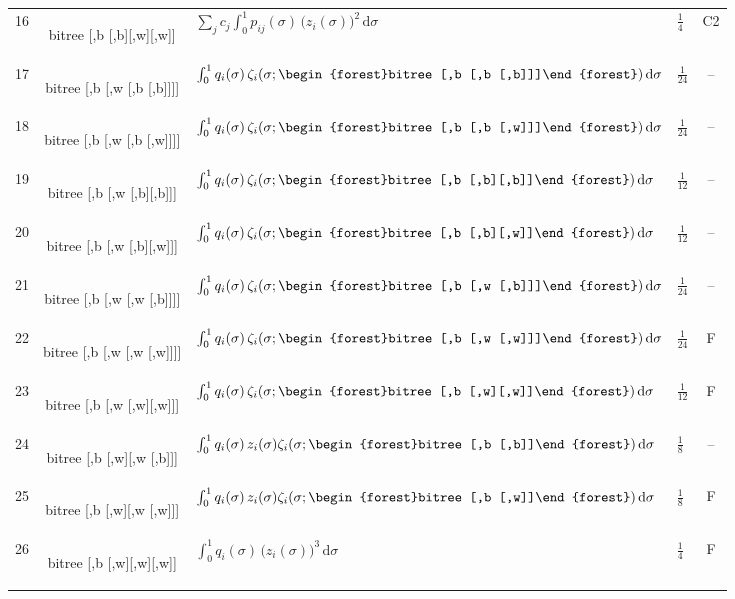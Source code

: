 \documentclass[11pt,a4paper]{article}
\theoremstyle{definition}
\theoremstyle{remark}
\newcommand{\dd}{\,\mathrm{d}}
\newcommand{\btree}[1]{\begin{forest}bitree #1\end{forest}}
\newcommand{\Tbb}{\btree{[,b [,b]]}}
\newcommand{\Tbw}{\btree{[,b [,w]]}}
\newcommand{\Tbbb}{\btree{[,b [,b][,b]]}}
\newcommand{\Tbbw}{\btree{[,b [,b][,w]]}}
\newcommand{\Tbww}{\btree{[,b [,w][,w]]}}
\newcommand{\Tbbbl}{\btree{[,b [,b [,b]]]}}
\newcommand{\Tbbwl}{\btree{[,b [,b [,w]]]}}
\newcommand{\Tbwbl}{\btree{[,b [,w [,b]]]}}
\newcommand{\Tbwwl}{\btree{[,b [,w [,w]]]}}
\begin{document}
{\begin{longtable}{rcllc}
16 & \btree{[,b [,b][,w][,w]]} & $\sum_j c_j\int_0^1 p_{ij}(\sigma)\,\big(z_i(\sigma)\big)^{2}\dd\sigma$ & $\frac1{4}$ & C2\\[3pt]
17 & \btree{[,b [,w [,b [,b]]]]} & $\int_0^1 q_i(\sigma)\,\zeta_i(\sigma;\Tbbbl)\dd\sigma$ & $\frac1{24}$ & --\\[3pt]
18 & \btree{[,b [,w [,b [,w]]]]} & $\int_0^1 q_i(\sigma)\,\zeta_i(\sigma;\Tbbwl)\dd\sigma$ & $\frac1{24}$ & --\\[3pt]
19 & \btree{[,b [,w [,b][,b]]]} & $\int_0^1 q_i(\sigma)\,\zeta_i(\sigma;\Tbbb)\dd\sigma$ & $\frac1{12}$ & --\\[3pt]
20 & \btree{[,b [,w [,b][,w]]]} & $\int_0^1 q_i(\sigma)\,\zeta_i(\sigma;\Tbbw)\dd\sigma$ & $\frac1{12}$ & --\\[3pt]
21 & \btree{[,b [,w [,w [,b]]]]} & $\int_0^1 q_i(\sigma)\,\zeta_i(\sigma;\Tbwbl)\dd\sigma$ & $\frac1{24}$ & --\\[3pt]
22 & \btree{[,b [,w [,w [,w]]]]} & $\int_0^1 q_i(\sigma)\,\zeta_i(\sigma;\Tbwwl)\dd\sigma$ & $\frac1{24}$ & F\\[3pt]
23 & \btree{[,b [,w [,w][,w]]]} & $\int_0^1 q_i(\sigma)\,\zeta_i(\sigma;\Tbww)\dd\sigma$ & $\frac1{12}$ & F\\[3pt]
24 & \btree{[,b [,w][,w [,b]]]} & $\int_0^1 q_i(\sigma)\,z_i(\sigma)\zeta_i(\sigma;\Tbb)\dd\sigma$ & $\frac1{8}$ & --\\[3pt]
25 & \btree{[,b [,w][,w [,w]]]} & $\int_0^1 q_i(\sigma)\,z_i(\sigma)\zeta_i(\sigma;\Tbw)\dd\sigma$ & $\frac1{8}$ & F\\[3pt]
26 & \btree{[,b [,w][,w][,w]]} & $\int_0^1 q_i(\sigma)\,\big(z_i(\sigma)\big)^{3}\dd\sigma$ & $\frac1{4}$ & F\\[3pt]
\end{longtable}}
\end{document}
